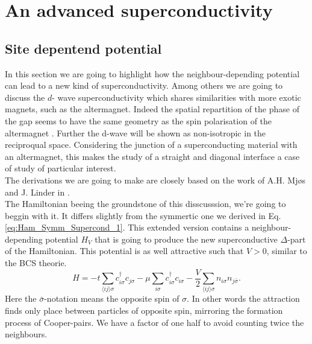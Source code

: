 \documentclass[../main.tex]{subfile}
\begin{document}
\section{An advanced superconductivity}
\subsection{Site depentend potential}
In this section we are going to highlight how the neighbour-depending potential can lead to a new kind of superconductivity. Among others we are going to discuss the $d$-
wave superconductivity which shares similarities with more exotic magnets, such as the altermagnet. 
Indeed the spatial repartition of the phase of the gap seems to have the same geometry as the spin polarisation of the altermagnet \cite{Smejkal2022} .
Further the d-wave will be shown as non-isotropic in the reciproqual space. Considering the junction of a superconducting material with an altermagnet, this 
makes the study of a straight and diagonal interface a case of study of particular interest.\\       
The derivations we are going to make are closely based on the work of A.H. Mjøs and J. Linder in \cite{Mjos2019}.\\

The Hamiltonian beeing the groundstone of this 
disscusssion, we're going to beggin with it. It differs slightly from the symmertic one we derived in Eq.\ref{eq:Ham_Symm_Supercond_1}. This extended version contains a neighbour-depending potential 
$H_V$ that is going to 
produce the new superconductive $\Delta$-part of the Hamiltonian. This potential is as well attractive such that $V>0$, similar to the BCS theorie.
\begin{equation}
    H = -t\sum_{\langle ij\rangle \sigma} c_{i\sigma}^{\dagger}c_{j\sigma} - \mu \sum_{i\sigma} c_{i\sigma}^{\dagger}c_{i\sigma} - \frac{V}{2} \sum_{\langle ij\rangle \sigma} n_{i\sigma}n_{j\bar{\sigma}}.
\end{equation}
Here the $\bar{\sigma}$-notation means the opposite spin of $\sigma$. In other words the attraction finds only place between particles of opposite spin,
 mirroring the formation process of Cooper-pairs.
We have a factor of one half to avoid counting twice the neighbours.\\
\end{document}

